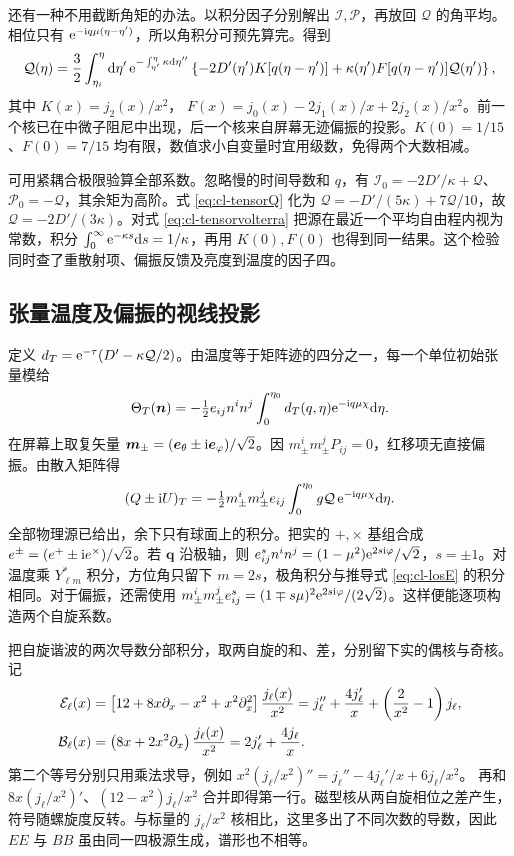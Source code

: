 还有一种不用截断角矩的办法。以积分因子分别解出 $\mathcal I,\mathcal P$，再放回 $\mathcal Q$ 的角平均。相位只有 $\mathrm{e}^{-\mathrm{i} q\mu(\eta-\eta')}$，所以角积分可预先算完。得到
\begin{equation}\label{eq:cl-tensorvolterra}
 \mathcal Q(\eta)=\frac32\int_{\eta_i}^\eta \dd\eta'\,
  \mathrm{e}^{-\int_{\eta'}^\eta\kappa\dd\eta''}
  \left\{-2D'(\eta')K[q(\eta-\eta')]
           +\kappa(\eta')F[q(\eta-\eta')]\mathcal Q(\eta')\right\},
\end{equation}
其中 $K(x)=j_2(x)/x^2$，
$F(x)=j_0(x)-2j_1(x)/x+2j_2(x)/x^2$。前一个核已在中微子阻尼中出现，后一个核来自屏幕无迹偏振的投影。$K(0)=1/15$、$F(0)=7/15$ 均有限，数值求小自变量时宜用级数，免得两个大数相减。

可用紧耦合极限验算全部系数。忽略慢的时间导数和 $q$，有 $\mathcal I_0=-2D'/\kappa+\mathcal Q$、$\mathcal P_0=-\mathcal Q$，其余矩为高阶。式 \eqref{eq:cl-tensorQ} 化为 $\mathcal Q=-D'/(5\kappa)+7\mathcal Q/10$，故 $\mathcal Q=-2D'/(3\kappa)$。对式 \eqref{eq:cl-tensorvolterra} 把源在最近一个平均自由程内视为常数，积分 $\int_0^\infty\mathrm{e}^{-\kappa s}\dd s=1/\kappa$，再用 $K(0),F(0)$ 也得到同一结果。这个检验同时查了重散射项、偏振反馈及亮度到温度的因子四。

\subsection{张量温度及偏振的视线投影}

定义 $d_T=\mathrm{e}^{-\tau}(D'-\kappa\mathcal Q/2)$。由温度等于矩阵迹的四分之一，每一个单位初始张量模给
\[
 \Theta_T(\bm n)=-\tfrac12e_{ij}n^in^j
           \int_0^{\eta_0}d_T(q,\eta)\mathrm{e}^{-\mathrm{i} q\mu\chi}\dd\eta .
\]
在屏幕上取复矢量 $\bm m_\pm=(\bm e_\theta\pm\mathrm{i}\bm e_\varphi)/\sqrt2$。因 $m_\pm^i m_\pm^jP_{ij}=0$，红移项无直接偏振。由散入矩阵得
\[
 (Q\pm\mathrm{i} U)_T=-\tfrac12m_\pm^i m_\pm^j e_{ij}
          \int_0^{\eta_0}g\mathcal Q\,\mathrm{e}^{-\mathrm{i} q\mu\chi}\dd\eta .
\]
全部物理源已给出，余下只有球面上的积分。把实的 $+,\times$ 基组合成 $e^{\pm}=(e^+\pm\mathrm{i} e^\times)/\sqrt2$。若 $\bm q$ 沿极轴，则 $e^{s}_{ij}n^in^j=(1-\mu^2)\mathrm{e}^{2s\mathrm{i}\varphi}/\sqrt2$，$s=\pm1$。对温度乘 $Y_{\ell m}^*$ 积分，方位角只留下 $m=2s$，极角积分与推导式 \eqref{eq:cl-losE} 的积分相同。对于偏振，还需使用 $m_\pm^i m_\pm^j e^s_{ij}=(1\mp s\mu)^2\mathrm{e}^{2s\mathrm{i}\varphi}/(2\sqrt2)$。这样便能逐项构造两个自旋系数。

把自旋谐波的两次导数分部积分，取两自旋的和、差，分别留下实的偶核与奇核。记
\begin{align*}
 \mathcal E_\ell(x)&=\left[12+8x\partial_x-x^2+x^2\partial_x^2\right]
                                         \frac{j_\ell(x)}{x^2}
   =j_\ell''+\frac{4j_\ell'}x+\left(\frac2{x^2}-1\right)j_\ell,\\
 \mathcal B_\ell(x)&=\left(8x+2x^2\partial_x\right)\frac{j_\ell(x)}{x^2}
                         =2j_\ell'+\frac{4j_\ell}x .
\end{align*}
第二个等号分别只用乘法求导，例如
$x^2(j_\ell/x^2)''=j_\ell''-4j_\ell'/x+6j_\ell/x^2$。
再和 $8x(j_\ell/x^2)'$、$(12-x^2)j_\ell/x^2$ 合并即得第一行。磁型核从两自旋相位之差产生，符号随螺旋度反转。与标量的 $j_\ell/x^2$ 核相比，这里多出了不同次数的导数，因此 $EE$ 与 $BB$ 虽由同一四极源生成，谱形也不相等。

